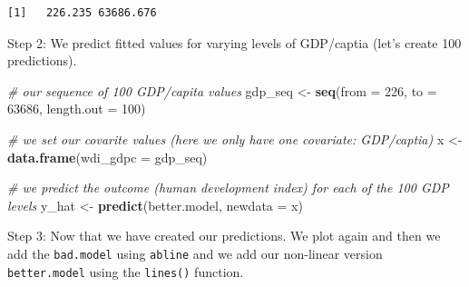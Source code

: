 \documentclass[]{article}
\newenvironment{Shaded}{\begin{snugshade}}{\end{snugshade}}
\newcommand{\KeywordTok}[1]{\textcolor[rgb]{0.13,0.29,0.53}{\textbf{#1}}}
\newcommand{\DataTypeTok}[1]{\textcolor[rgb]{0.13,0.29,0.53}{#1}}
\newcommand{\DecValTok}[1]{\textcolor[rgb]{0.00,0.00,0.81}{#1}}
\newcommand{\StringTok}[1]{\textcolor[rgb]{0.31,0.60,0.02}{#1}}
\newcommand{\CommentTok}[1]{\textcolor[rgb]{0.56,0.35,0.01}{\textit{#1}}}
\newcommand{\OtherTok}[1]{\textcolor[rgb]{0.56,0.35,0.01}{#1}}
\newcommand{\OperatorTok}[1]{\textcolor[rgb]{0.81,0.36,0.00}{\textbf{#1}}}
\newcommand{\NormalTok}[1]{#1}
\theoremstyle{definition}
\theoremstyle{definition}
\theoremstyle{definition}
\theoremstyle{remark}
\begin{document}
\begin{verbatim}
[1]   226.235 63686.676
\end{verbatim}

Step 2: We predict fitted values for varying levels of GDP/captia (let's
create 100 predictions).

\begin{Shaded}
\begin{Highlighting}[]
\CommentTok{# our sequence of 100 GDP/capita values}
\NormalTok{gdp_seq <-}\StringTok{ }\KeywordTok{seq}\NormalTok{(}\DataTypeTok{from =} \DecValTok{226}\NormalTok{, }\DataTypeTok{to =} \DecValTok{63686}\NormalTok{, }\DataTypeTok{length.out =} \DecValTok{100}\NormalTok{)}

\CommentTok{# we set our covarite values (here we only have one covariate: GDP/captia)}
\NormalTok{x <-}\StringTok{ }\KeywordTok{data.frame}\NormalTok{(}\DataTypeTok{wdi_gdpc =}\NormalTok{ gdp_seq)}

\CommentTok{# we predict the outcome (human development index) for each of the 100 GDP levels}
\NormalTok{y_hat <-}\StringTok{ }\KeywordTok{predict}\NormalTok{(better.model, }\DataTypeTok{newdata =}\NormalTok{ x)}
\end{Highlighting}
\end{Shaded}

Step 3: Now that we have created our predictions. We plot again and then
we add the \texttt{bad.model} using \texttt{abline} and we add our
non-linear version \texttt{better.model} using the \texttt{lines()}
function.

\begin{Shaded}
\end{Shaded}
\end{document}

